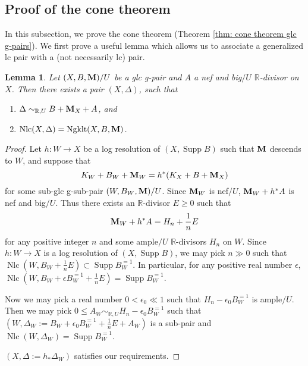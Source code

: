 \documentclass[11pt]{amsart}
\numberwithin{equation}{section}
\newcommand{\Mm}{{\bf{M}}}
\newcommand{\Rr}{\mathbb{R}}
\newcommand{\Supp}{\operatorname{Supp}}
\newcommand{\Ngklt}{\operatorname{Ngklt}}
\newcommand{\Nlc}{\operatorname{Nlc}}
\newtheorem{lem}[thm]{Lemma}
\theoremstyle{definition}
\theoremstyle{definition}
\theoremstyle{definition}
\begin{document}
\subsection{Proof of the cone theorem}

In this subsection, we prove the cone theorem (Theorem \ref{thm: cone theorem glc g-pairs}).  We first prove a useful lemma which allows us to associate a generalized lc pair with a (not necessarily lc) pair.

\begin{lem}\label{lem: perturb gpair to make nlc locus ngklt locus}
Let $(X,B,\Mm)/U$ be a glc g-pair and $A$ a nef and big$/U$ $\Rr$-divisor on $X$. Then there exists a pair $(X,\Delta)$, such that
\begin{enumerate}
    \item $\Delta\sim_{\Rr,U}B+\Mm_X+A$, and
    \item $\Nlc(X,\Delta)=\Ngklt(X,B,\Mm)$.
\end{enumerate}
\end{lem}
\begin{proof}
Let $h: W\rightarrow X$ be a log resolution of $(X,\Supp B)$ such that $\Mm$ descends to $W$, and suppose that
$$K_W+B_W+\Mm_W=h^*(K_X+B+\Mm_X)$$
for some sub-glc g-sub-pair $(W,B_W,\Mm)/U$. Since $\Mm_W$ is nef$/U$, $\Mm_W+h^*A$ is nef and big$/U$. Thus there exists an $\Rr$-divisor $E\geq 0$ such that
$$\Mm_W+h^*A=H_n+\frac{1}{n}E$$
for any positive integer $n$ and some ample$/U$ $\Rr$-divisors $H_n$ on $W$. Since $h: W\rightarrow X$ is a log resolution of $(X,\Supp B)$, we may pick $n\gg 0$ such that $\Nlc(W,B_W+\frac{1}{n}E)\subset\Supp B_W^{=1}$. In particular, for any positive real number $\epsilon$, $\Nlc(W,B_W+\epsilon B_W^{=1}+\frac{1}{n}E)=\Supp B_W^{=1}$.

Now we may pick a real number $0<\epsilon_0\ll 1$ such that $H_n-\epsilon_0 B_W^{=1}$ is ample$/U$. Then we may pick $0\leq A_W\sim_{\Rr,U}H_n-\epsilon_0 B_W^{=1}$ such that $(W,\Delta_W:=B_W+\epsilon_0 B_W^{=1}+\frac{1}{n}E+A_W)$ is a sub-pair and $\Nlc(W,\Delta_W)=\Supp B_W^{=1}$.

$(X,\Delta:=h_*\Delta_W)$ satisfies our requirements.
\end{proof}
\end{document}
